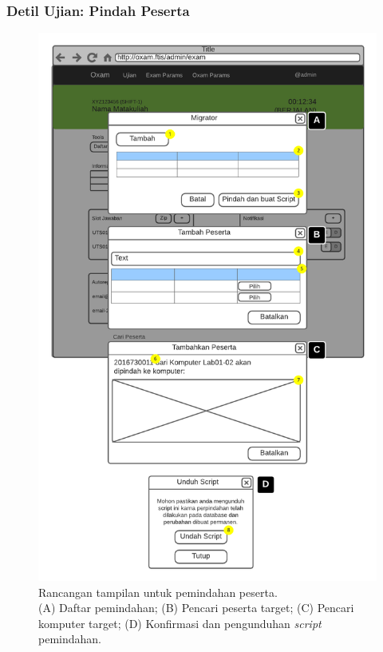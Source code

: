 \subsubsection{Detil Ujian: Pindah Peserta}
    \begin{figure}
        \centering
        \includegraphics[height=0.7\paperheight]{Gambar/mockups/Mockup--Admin - Pindah Peserta.pdf}
        \caption{Rancangan tampilan untuk pemindahan peserta. \\
            (A) Daftar pemindahan; (B) Pencari peserta target; (C) Pencari komputer target; (D) Konfirmasi dan
            pengunduhan \textit{script} pemindahan.}
        \label{fig:mockup_admin_exam_det_migrator}
    \end{figure}
    
